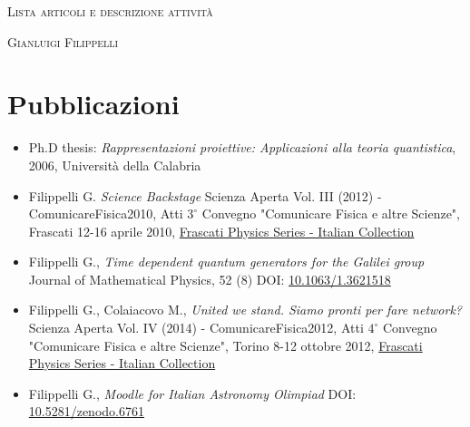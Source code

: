 \documentclass[a4paper,latin1,italian]{article}
\begin{document}
\pagestyle{empty}

\begin{center}
\huge{\textsc{Lista articoli e descrizione attivit\`a}}
\vspace{\baselineskip}
	
	\Large{\textsc{Gianluigi Filippelli}}
\end{center}
\vspace{1.5\baselineskip}

\section{Pubblicazioni}
\begin{itemize}
	\item Ph.D thesis: {\em Rappresentazioni proiettive: Applicazioni alla teoria quantistica}, 2006, Universit\`a della Calabria
	\item Filippelli G. {\em Science Backstage} Scienza Aperta Vol. III (2012) - ComunicareFisica2010, Atti $3^\circ$ Convegno "Comunicare Fisica e altre Scienze", Frascati 12-16 aprile 2010, \href{http://www.lnf.infn.it/sis/frascatiseries/italiancollection/index_ita.php}{Frascati Physics Series - Italian Collection}
	\item Filippelli G., {\em Time dependent quantum generators for the Galilei group} Journal of Mathematical Physics, 52 (8) DOI: \href{http://dx.doi.org/10.1063/1.3621518}{10.1063/1.3621518}
	\item Filippelli G., Colaiacovo M., {\em United we stand. Siamo pronti per fare network?} Scienza Aperta Vol. IV (2014) - ComunicareFisica2012, Atti $4^\circ$ Convegno "Comunicare Fisica e altre Scienze", Torino 8-12 ottobre 2012, \href{http://www.lnf.infn.it/sis/frascatiseries/italiancollection/index_ita.php}{Frascati Physics Series - Italian Collection}
	\item Filippelli G., {\em Moodle for Italian Astronomy Olimpiad} DOI: \href{http://dx.doi.org/10.5281/zenodo.6761}{10.5281/zenodo.6761}
\end{itemize}
%
\end{document}
